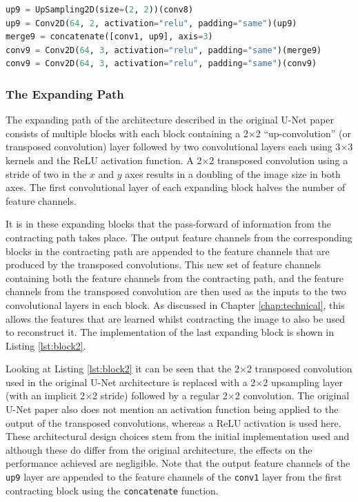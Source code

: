 \begin{lstlisting}[float={!t},caption={The implementation of the last expanding block of the U-Net architecture using the Keras functional API.},label={lst:block2},language=Python,upquote=true,belowskip=0pt]
up9 = UpSampling2D(size=(2, 2))(conv8)
up9 = Conv2D(64, 2, activation="relu", padding="same")(up9)
merge9 = concatenate([conv1, up9], axis=3)
conv9 = Conv2D(64, 3, activation="relu", padding="same")(merge9)
conv9 = Conv2D(64, 3, activation="relu", padding="same")(conv9)
\end{lstlisting}
\subsubsection{The Expanding Path}

The expanding path of the architecture described in the original U-Net paper consists of multiple blocks with each block containing a 2$\times$2 ``up-convolution'' (or transposed convolution) layer followed by two convolutional layers each using 3$\times$3 kernels and the ReLU activation function. A 2$\times$2 transposed convolution using a stride of two in the $x$ and $y$ axes results in a doubling of the image size in both axes. The first convolutional layer of each expanding block halves the number of feature channels.

It is in these expanding blocks that the pass-forward of information from the contracting path takes place. The output feature channels from the corresponding blocks in the contracting path are appended to the feature channels that are produced by the transposed convolutions. This new set of feature channels containing both the feature channels from the contracting path, and the feature channels from the transposed convolution are then used as the inputs to the two convolutional layers in each block. As discussed in Chapter \ref{chap:technical}, this allows the features that are learned whilst contracting the image to also be used to reconstruct it. The implementation of the last expanding block is shown in Listing \ref{lst:block2}.

Looking at Listing \ref{lst:block2} it can be seen that the 2$\times$2 transposed convolution used in the original U-Net architecture is replaced with a 2$\times$2 upsampling layer (with an implicit 2$\times$2 stride) followed by a regular 2$\times$2 convolution. The original U-Net paper also does not mention an activation function being applied to the output of the transposed convolutions, whereas a ReLU activation is used here. These architectural design choices stem from the initial implementation used and although these do differ from the original architecture, the effects on the performance achieved are negligible. Note that the output feature channels of the \texttt{up9} layer are appended to the feature channels of the \texttt{conv1} layer from the first contracting block using the \texttt{concatenate} function.


